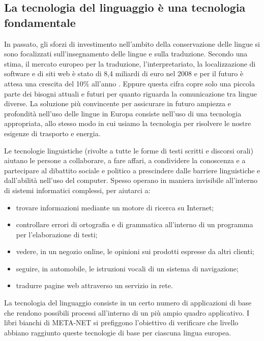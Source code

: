 \documentclass[]{../../metanetpaper}
\begin{document}
\begin{multicols}{2}
\subsection{La tecnologia del linguaggio \`{e} una tecnologia fondamentale}

In passato, gli sforzi di investimento nell'ambito della conservazione delle
lingue si sono focalizzati sull'insegnamento delle lingue e sulla
traduzione. Secondo una stima, il mercato europeo per la traduzione,
l'interpretariato, la localizzazione di software e di siti web \`{e} stato di
8,4 miliardi di euro nel 2008 e per il futuro \`{e} attesa una crescita del
10\% all'anno \cite{EC3}. Eppure questa cifra copre solo una piccola parte dei
bisogni attuali e futuri per quanto riguarda la comunicazione tra lingue
diverse. La soluzione pi\`{u} convincente per assicurare in futuro ampiezza e
profondit\`{a} nell'uso delle lingue in Europa consiste nell'uso di una
tecnologia appropriata, allo stesso modo in cui usiamo la tecnologia per
risolvere le nostre esigenze di trasporto e energia.

Le tecnologie linguistiche (rivolte a tutte le forme di testi scritti e
discorsi orali) aiutano le persone a collaborare, a fare affari, a condividere
la conoscenza e a partecipare al dibattito sociale e politico a prescindere
dalle barriere linguistiche e dall'abilit\`{a} nell'uso del computer. Spesso
operano in maniera invisibile all'interno di sistemi informatici complessi,
per aiutarci a:


\begin{itemize}
\item trovare informazioni mediante un motore di ricerca su Internet;
\item controllare errori di ortografia e di grammatica all'interno di un programma per l'elaborazione di testi;
\item vedere, in un negozio online, le opinioni sui prodotti espresse da altri
  clienti;
\item seguire, in automobile, le istruzioni vocali di un sistema di navigazione;
\item tradurre pagine web attraverso un servizio in rete. 
\end{itemize}

La tecnologia del linguaggio consiste in un certo numero di applicazioni di
base che rendono possibili processi all'interno di un pi\`{u} ampio quadro
applicativo. I libri bianchi di META-NET si prefiggono l'obiettivo di
verificare che livello abbiano raggiunto queste tecnologie di base per
ciascuna lingua europea.



\end{multicols}
\end{document}

